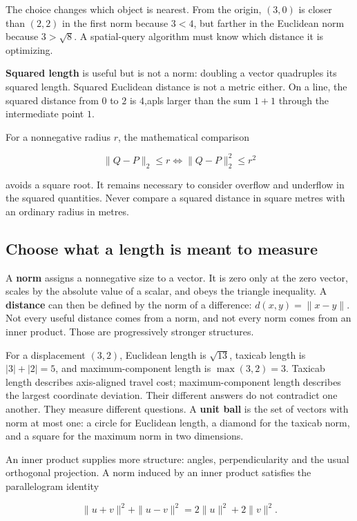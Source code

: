 The choice changes which object is nearest. From the origin, \((3,0)\) is closer than \((2,2)\) in the first norm because \(3<4\), but farther in the Euclidean norm because \(3>\sqrt8\). A spatial-query algorithm must know which distance it is optimizing.

\textbf{Squared length} is useful but is not a norm: doubling a vector quadruples its squared length. Squared Euclidean distance is not a metric either. On a line, the squared distance from \(0\) to \(2\) is \(4\),apls larger than the sum \(1+1\) through the intermediate point \(1\).

For a nonnegative radius \(r\), the mathematical comparison

\[
\|Q-P\|_2\le r
\iff\|Q-P\|_2^2\le r^2
\]

avoids a square root. It remains necessary to consider overflow and underflow in the squared quantities. Never compare a squared distance in square metres with an ordinary radius in metres.

\subsection{Choose what a length is meant to measure}\label{01-foundations-i-ch017-choose-what-a-length-is-meant-to-measure}

A \textbf{norm} assigns a nonnegative size to a vector. It is zero only at the zero vector, scales by the absolute value of a scalar, and obeys the triangle inequality. A \textbf{distance} can then be defined by the norm of a difference: \(d(x,y)=\|x-y\|\). Not every useful distance comes from a norm, and not every norm comes from an inner product. Those are progressively stronger structures.

For a displacement \((3,2)\), Euclidean length is \(\sqrt{13}\), taxicab length is \(|3|+|2|=5\), and maximum-component length is \(\max(3,2)=3\). Taxicab length describes axis-aligned travel cost; maximum-component length describes the largest coordinate deviation. Their different answers do not contradict one another. They measure different questions. A \textbf{unit ball} is the set of vectors with norm at most one: a circle for Euclidean length, a diamond for the taxicab norm, and a square for the maximum norm in two dimensions.

An inner product supplies more structure: angles, perpendicularity and the usual orthogonal projection. A norm induced by an inner product satisfies the parallelogram identity

\[
\|u+v\|^2+\|u-v\|^2=2\|u\|^2+2\|v\|^2.
\]

